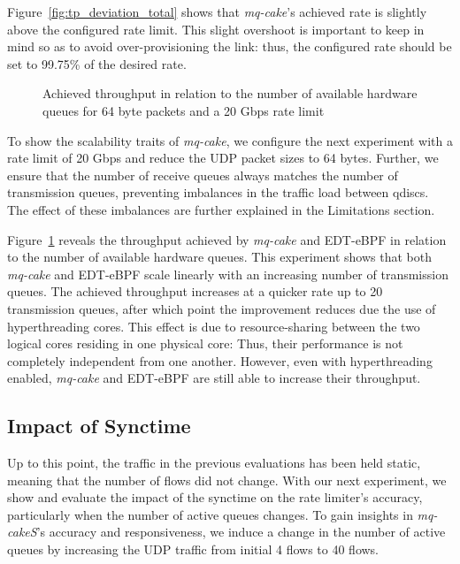 Figure~\ref{fig:tp_deviation_total} shows that  \textit{mq-cake}'s achieved rate is slightly above the configured rate limit.
%
This slight overshoot is important to keep in mind so as to avoid over-provisioning the link: thus, the configured rate should be set to 99.75\% of the desired rate.
%

\begin{figure}[h]
    \centering
    
    \caption{Achieved throughput in relation to the number of available hardware queues for 64 byte packets and a 20 Gbps rate limit}\label{fig:scaling}
\end{figure}
To show the scalability traits of \textit{mq-cake}, we configure the next experiment with a rate limit of 20 Gbps and reduce the UDP packet sizes to 64 bytes.
%
Further, we ensure that the number of receive queues always matches the number of transmission queues, preventing imbalances in the traffic load between qdiscs.
%
The effect of these imbalances are further explained in the Limitations section.
%

Figure~\ref{fig:scaling} reveals the throughput achieved by \textit{mq-cake} and EDT-eBPF in relation to the number of available hardware queues.
%
This experiment shows that both \textit{mq-cake} and EDT-eBPF scale linearly with an increasing number of transmission queues.
%
The achieved throughput increases at a quicker rate up to 20 transmission queues, after which point the improvement reduces due the use of hyperthreading cores.
%
This effect is due to resource-sharing between the two logical cores residing in one physical core:
%
Thus, their performance is not completely independent from one another.
%
However, even with hyperthreading enabled, \textit{mq-cake} and EDT-eBPF are still able to increase their throughput.

\subsection{Impact of Synctime}\label{sec:synchronization-time}
Up to this point, the traffic in the previous evaluations has been held static, meaning that the number of flows did not change.
%
With our next experiment, we show and evaluate the impact of the synctime on the rate limiter's accuracy, particularly when the number of active queues changes.
%
To gain insights in \textit{mq-cakeS}'s accuracy and responsiveness, we induce a change in the number of active queues by increasing the UDP traffic from initial 4 flows to 40 flows.
%

